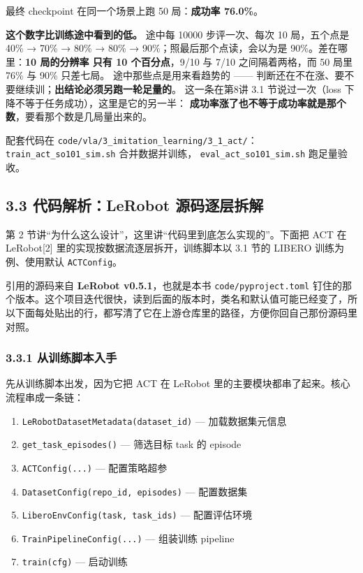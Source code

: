 \documentclass[
  chinese,
]{ctexart}
\providecommand{\tightlist}{%
  \setlength{\itemsep}{0pt}\setlength{\parskip}{0pt}}
\begin{document}
最终 checkpoint 在同一个场景上跑 50 局：\textbf{成功率 76.0\%}。

\textbf{这个数字比训练途中看到的低。} 途中每 10000 步评一次、每次 10
局，五个点是 40\% → 70\% → 80\% → 80\% → 90\%；照最后那个点读，会以为是
90\%。差在哪里：\textbf{10 局的分辨率 只有 10 个百分点}，9/10 与 7/10
之间隔着两格，而 50 局里 76\% 与 90\% 只差七局。
途中那些点是用来看趋势的 ------
判断还在不在涨、要不要继续训；\textbf{出结论必须另跑一轮足量的}。
这一条在第8讲 3.1 节说过一次（loss
下降不等于任务成功），这里是它的另一半：
\textbf{成功率涨了也不等于成功率就是那个数}，要看那个数是几局量出来的。

配套代码在
\texttt{code/vla/3\_imitation\_learning/3\_1\_act/}：\texttt{train\_act\_so101\_sim.sh}
合并数据并训练， \texttt{eval\_act\_so101\_sim.sh} 跑足量验收。

\subsection{3.3 代码解析：LeRobot
源码逐层拆解}\label{ux4ee3ux7801ux89e3ux6790lerobot-ux6e90ux7801ux9010ux5c42ux62c6ux89e3}

第 2 节讲``为什么这么设计''，这里讲``代码里到底怎么实现的''。下面把 ACT
在 LeRobot{[}2{]} 里的实现按数据流逐层拆开，训练脚本以 3.1 节的 LIBERO
训练为例、使用默认 \texttt{ACTConfig}。

引用的源码来自 \textbf{LeRobot v0.5.1}，也就是本书
\texttt{code/pyproject.toml}
钉住的那个版本。这个项目迭代很快，读到后面的版本时，类名和默认值可能已经变了，所以下面每处贴出的行，都写清了它在上游仓库里的路径，方便你回自己那份源码里对照。

\subsubsection{3.3.1
从训练脚本入手}\label{ux4eceux8badux7ec3ux811aux672cux5165ux624b}

先从训练脚本出发，因为它把 ACT 在 LeRobot
里的主要模块都串了起来。核心流程串成一条链：

\begin{enumerate}
\def\labelenumi{\arabic{enumi}.}
\tightlist
\item
  \texttt{LeRobotDatasetMetadata(dataset\_id)} --- 加载数据集元信息
\item
  \texttt{get\_task\_episodes()} --- 筛选目标 task 的 episode
\item
  \texttt{ACTConfig(...)} --- 配置策略超参
\item
  \texttt{DatasetConfig(repo\_id,\ episodes)} --- 配置数据集
\item
  \texttt{LiberoEnvConfig(task,\ task\_ids)} --- 配置评估环境
\item
  \texttt{TrainPipelineConfig(...)} --- 组装训练 pipeline
\item
  \texttt{train(cfg)} --- 启动训练
\end{enumerate}
\end{document}
